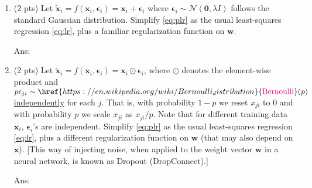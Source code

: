 \documentclass[10pt]{article}
\newcommand{\wv}{\mathbf{w}}
\newcommand{\xv}{\mathbf{x}}
\newcommand{\epsilonv}{\boldsymbol{\epsilon}}
\newcommand{\ans}[1]{{\color{blue}\textsf{Ans}: #1}}
\newcommand{\zero}{\mathbf{0}}
\newcommand{\magenta}[1]{{\color{magenta}#1}}
\begin{document}
\begin{exercise}
		\begin{enumerate}
			\item (2 pts) Let $\tilde{\xv}_i = f(\xv_i, \epsilonv_i) = \xv_i + \epsilonv_i$ where $\epsilonv_i \sim \mathcal{N}(\zero, \lambda I)$ follows the standard Gaussian distribution. Simplify \eqref{eq:plr} as the usual least-squares regression \eqref{eq:lr}, plus a familiar regularization function on $\wv$.
			
			\ans{\vskip5cm
			}
				
			\item (2 pts) Let $\tilde{\xv}_i = f(\xv_i, \epsilonv_i) = \xv_i \odot \epsilonv_i$, where $\odot$ denotes the element-wise product and $p \epsilon_{ji} \sim \href{https://en.wikipedia.org/wiki/Bernoulli_distribution}{\magenta{\mathrm{Bernoulli}}}(p)$ \href{https://en.wikipedia.org/wiki/Independence_(probability_theory)}{\magenta{independently}} for each $j$. That is, with probability $1-p$ we reset $x_{ji} $ to 0 and with probability $p$ we scale $x_{ji}$ as $x_{ji}/p$. Note that for different training data $\xv_i$, $\epsilonv_i$'s are independent. Simplify \eqref{eq:plr} as the usual least-squares regression \eqref{eq:lr}, plus a different regularization function on $\wv$ (that may also depend on $\xv$). [This way of injecting noise, when applied to the weight vector $\wv$ in a neural network, is known as Dropout (DropConnect).]
	
		    \ans{\vskip8cm} 		
		\end{enumerate}
	\end{exercise}
\end{document}
